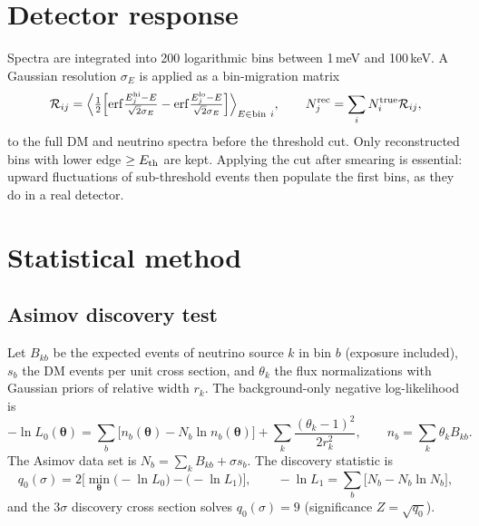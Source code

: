 \documentclass[11pt,a4paper]{article}
\numberwithin{equation}{section}
\newcommand{\Eth}{E_{\rm th}}
\begin{document}
\section{Detector response}
Spectra are integrated into 200 logarithmic bins between 1\,meV and 100\,keV. A Gaussian
resolution $\sigma_E$ is applied as a bin-migration matrix
\begin{equation}
  \mathcal R_{ij}=\Big\langle\tfrac12\Big[\mathrm{erf}\tfrac{E_j^{\rm hi}-E}{\sqrt2\sigma_E}
  -\mathrm{erf}\tfrac{E_j^{\rm lo}-E}{\sqrt2\sigma_E}\Big]\Big\rangle_{E\in{\rm bin}\ i},
  \qquad N^{\rm rec}_j=\sum_i N^{\rm true}_i\mathcal R_{ij},
\end{equation}
to the full DM and neutrino spectra before the threshold cut. Only reconstructed bins with
lower edge $\ge\Eth$ are kept. Applying the cut after smearing is essential: upward
fluctuations of sub-threshold events then populate the first bins, as they do in a real
detector.

\section{Statistical method}
\label{sec:stats}
\subsection{Asimov discovery test}
Let $B_{kb}$ be the expected events of neutrino source $k$ in bin $b$ (exposure included),
$s_b$ the DM events per unit cross section, and $\theta_k$ the flux normalizations with
Gaussian priors of relative width $r_k$. The background-only negative log-likelihood is
\begin{equation}
  -\ln L_0(\bm\theta)=\sum_b\big[n_b(\bm\theta)-N_b\ln n_b(\bm\theta)\big]
  +\sum_k\frac{(\theta_k-1)^2}{2r_k^2},\qquad n_b=\sum_k\theta_kB_{kb}.
\end{equation}
The Asimov data set is $N_b=\sum_kB_{kb}+\sigma s_b$. The discovery statistic is
\begin{equation}
  q_0(\sigma)=2\Big[\min_{\bm\theta}\big(-\ln L_0\big)-\big(-\ln L_1\big)\Big],\qquad
  -\ln L_1=\sum_b\big[N_b-N_b\ln N_b\big],
\end{equation}
and the 3$\sigma$ discovery cross section solves $q_0(\sigma)=9$ (significance
$Z=\sqrt{q_0}$).
\end{document}
